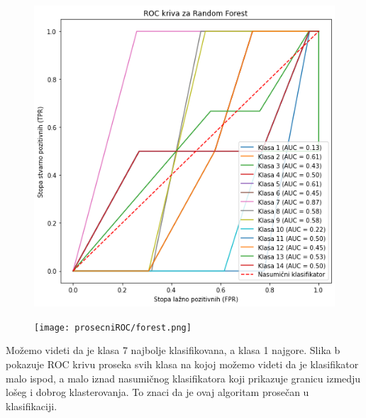 \documentclass{article}
\begin{document}
\begin{figure}[ht]
    \centering
    \begin{minipage}{0.5\textwidth}
        \centering
        \includegraphics[width=\textwidth]{forestROC.png}
        \renewcommand{\thefigure}{} 
        \captionsetup{labelformat=empty}
        \label{fig:udeo1}
    \end{minipage}\hfill
    \begin{minipage}{0.5\textwidth}
        \centering
        \texttt{[image: prosecniROC/forest.png]}
        \renewcommand{\thefigure}{} 
        \captionsetup{labelformat=empty}
        \label{fig:udeo2}
    \end{minipage}
\end{figure}
\begin{flushleft}

Možemo videti da je klasa 7 najbolje klasifikovana, a klasa 1 najgore. Slika b pokazuje ROC krivu proseka svih klasa na kojoj možemo videti da je klasifikator malo ispod, a malo iznad nasumičnog klasifikatora koji prikazuje granicu izmedju lošeg i dobrog klasterovanja. To znaci da je ovaj algoritam prosečan u klasifikaciji.

\end{flushleft}
\end{document}
